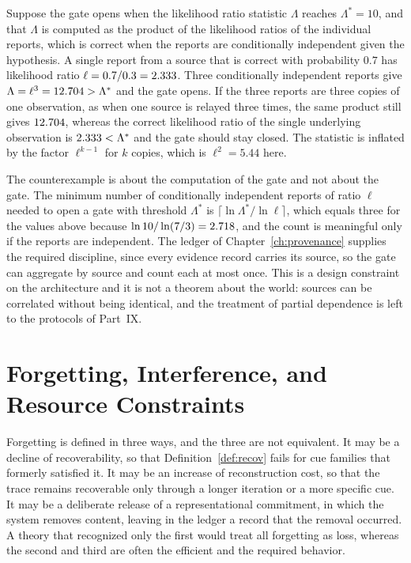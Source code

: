 \begin{counterex}\label{cex:gate28}
Suppose the gate opens when the likelihood ratio statistic $\Lambda$ reaches $\Lambda^\ast=10$, and that $\Lambda$ is computed as the product of the likelihood ratios of the individual reports, which is correct when the reports are conditionally independent given the hypothesis. A single report from a source that is correct with probability $0.7$ has likelihood ratio $\ell=0.7/0.3=2.333$. Three conditionally independent reports give $\Lambda=\ell^3=12.704>\Lambda^\ast$ and the gate opens. If the three reports are three copies of one observation, as when one source is relayed three times, the same product still gives $12.704$, whereas the correct likelihood ratio of the single underlying observation is $2.333<\Lambda^\ast$ and the gate should stay closed. The statistic is inflated by the factor $\ell^{k-1}$ for $k$ copies, which is $\ell^2=5.44$ here.
\end{counterex}

The counterexample is about the computation of the gate and not about the gate. The minimum number of conditionally independent reports of ratio $\ell$ needed to open a gate with threshold $\Lambda^\ast$ is $\lceil\ln\Lambda^\ast/\ln\ell\rceil$, which equals three for the values above because $\ln10/\ln(7/3)=2.718$, and the count is meaningful only if the reports are independent. The ledger of Chapter~\ref{ch:provenance} supplies the required discipline, since every evidence record carries its source, so the gate can aggregate by source and count each at most once. This is a design constraint on the architecture and it is not a theorem about the world: sources can be correlated without being identical, and the treatment of partial dependence is left to the protocols of Part~IX.


\chapter{Forgetting, Interference, and Resource Constraints}\label{ch:forgetting}

Forgetting is defined in three ways, and the three are not equivalent. It may be a decline of recoverability, so that Definition~\ref{def:recov} fails for cue families that formerly satisfied it. It may be an increase of reconstruction cost, so that the trace remains recoverable only through a longer iteration or a more specific cue. It may be a deliberate release of a representational commitment, in which the system removes content, leaving in the ledger a record that the removal occurred. A theory that recognized only the first would treat all forgetting as loss, whereas the second and third are often the efficient and the required behavior.

